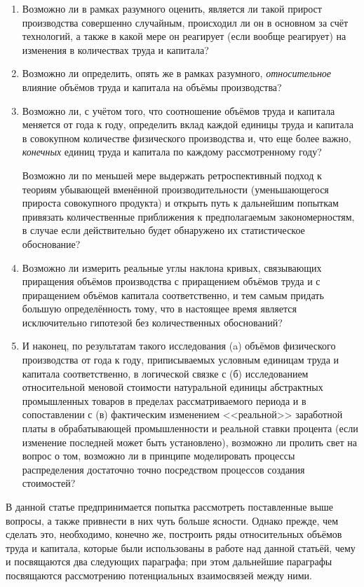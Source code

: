 \documentclass[leqno]{article}  %
\begin{document}
\begin{enumerate}[{(1)}]
\item Возможно ли в рамках разумного оценить, является ли такой прирост производства совершенно случайным, происходил ли он в основном за счёт технологий, а также в какой мере он реагирует (если вообще реагирует) на изменения в количествах труда и капитала?
\item Возможно ли определить, опять же в рамках разумного, \emph{относительное} влияние объёмов труда и капитала на объёмы производства?
\item Возможно ли, с учётом того, что соотношение объёмов труда и капитала меняется от года к году, определить вклад каждой единицы труда и капитала в совокупном количестве физического производства и, что еще более важно, \emph{конечных} единиц труда и капитала по каждому рассмотренному году?
\par
Возможно ли по меньшей мере выдержать ретроспективный подход к теориям убывающей вменённой производительности (уменьшающегося прироста совокупного продукта) и открыть путь к дальнейшим попыткам привязать количественные приближения к предполагаемым закономерностям, в случае если действительно будет обнаружено их статистическое обоснование?
\item Возможно ли измерить реальные углы наклона кривых, связывающих приращения объёмов производства с приращением объёмов труда и с приращением объёмов капитала соответственно, и тем самым придать большую определённость тому, что в настоящее время является исключительно гипотезой без количественных обоснований?
\item И наконец, по результатам такого исследования (a) объёмов физического производства от года к году, приписываемых условным единицам труда и капитала соответственно, в логической связке с (б) исследованием относительной меновой стоимости натуральной единицы абстрактных промышленных товаров в пределах рассматриваемого периода и в сопоставлении с (в) фактическим изменением <<реальной>> заработной платы в обрабатывающей промышленности и реальной ставки процента (если изменение последней может быть установлено), возможно ли пролить свет на вопрос о том, возможно ли в принципе моделировать процессы распределения достаточно точно посредством процессов создания стоимостей?
\end{enumerate}
\par
В данной статье предпринимается попытка рассмотреть поставленные выше вопросы, а также привнести в них чуть больше ясности. Однако прежде, чем сделать это, необходимо, конечно же, построить ряды относительных объёмов труда и капитала, которые были использованы в работе над данной статьёй, чему и посвящаются два следующих параграфа; при этом дальнейшие параграфы посвящаются рассмотрению потенциальных взаимосвязей между ними.
\end{document}
